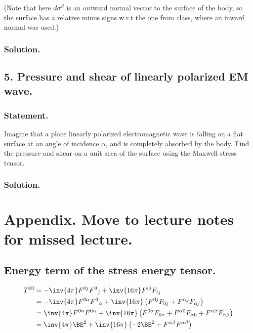 (Note that here $d \sigma^\beta$ is an outward normal vector to the surface of the body, so the surface has a relative minus signs w.r.t the one from class, where an inward normal was used.)

\subsubsection{Solution.}

\subsection{5. Pressure and shear of linearly polarized EM wave.}

\subsubsection{Statement.}

Imagine that a place linearly polarized electromagnetic wave is falling on a flat surface at an angle of incidence $\alpha$, and is completely absorbed by the body.  Find the pressure and shear on a unit area of the surface using the Maxwell stress tensor.

\subsubsection{Solution.}

\section{Appendix.  Move to lecture notes for missed lecture.}

\subsection{Energy term of the stress energy tensor.}

\begin{align*}
T^{ 0 0 } 
&=
-\inv{4 \pi} F^{ 0 j} {F^0}_j + \inv{16 \pi} F^{i j} F_{i j} \\
&=
-\inv{4 \pi} F^{ 0 \alpha} {F^0}_\alpha + \inv{16 \pi} \left(
F^{0 j} F_{0 j} 
+F^{\alpha j} F_{\alpha j} 
\right)
\\
&=
\inv{4 \pi} F^{ 0 \alpha} F^{0 \alpha} + \inv{16 \pi} 
\left(
F^{0 \alpha} F_{0 \alpha} 
+F^{\alpha 0} F_{\alpha 0} 
+F^{\alpha \beta} F_{\alpha \beta} 
\right)
\\
&=
\inv{4 \pi} \BE^2 + \inv{16 \pi} \left(
-2 \BE^2 +F^{\alpha \beta} F^{\alpha \beta} 
\right)
\end{align*}

